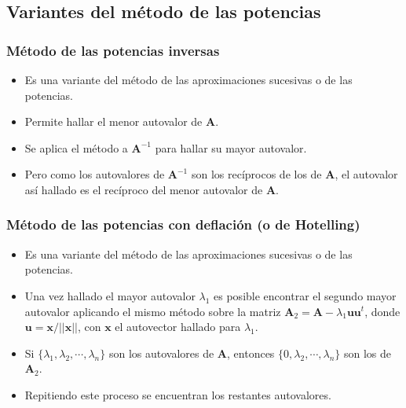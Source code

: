 \documentclass[openany]{book}
\providecommand{\tightlist}{%
  \setlength{\itemsep}{0pt}\setlength{\parskip}{0pt}}
\begin{document}
\hypertarget{variantes-del-muxe9todo-de-las-potencias}{%
\subsection{Variantes del método de las potencias}\label{variantes-del-muxe9todo-de-las-potencias}}

\hypertarget{muxe9todo-de-las-potencias-inversas}{%
\subsubsection*{Método de las potencias inversas}\label{muxe9todo-de-las-potencias-inversas}}

\begin{itemize}
\tightlist
\item
  Es una variante del método de las aproximaciones sucesivas o de las potencias.
\item
  Permite hallar el menor autovalor de \(\textbf{A}\).
\item
  Se aplica el método a \(\textbf{A}^{-1}\) para hallar su mayor autovalor.
\item
  Pero como los autovalores de \(\textbf{A}^{-1}\) son los recíprocos de los de \(\textbf{A}\), el autovalor así hallado es el recíproco del menor autovalor de \(\textbf{A}\).
\end{itemize}

\hypertarget{muxe9todo-de-las-potencias-con-deflaciuxf3n-o-de-hotelling}{%
\subsubsection*{Método de las potencias con deflación (o de Hotelling)}\label{muxe9todo-de-las-potencias-con-deflaciuxf3n-o-de-hotelling}}

\begin{itemize}
\item
  Es una variante del método de las aproximaciones sucesivas o de las potencias.
\item
  Una vez hallado el mayor autovalor \(\lambda_1\) es posible encontrar el segundo mayor autovalor aplicando el mismo método sobre la matriz \(\textbf{A}_2 = \textbf{A} - \lambda_1 \textbf{u} \textbf{u}^t\), donde \(\textbf{u} = \textbf{x} / ||\textbf{x}||\), con \(\textbf{x}\) el autovector hallado para \(\lambda_1\).
\item
  Si \(\{\lambda_1, \lambda_2, \cdots, \lambda_n\}\) son los autovalores de \(\textbf{A}\), entonces \(\{0, \lambda_2, \cdots, \lambda_n\}\) son los de \(\textbf{A}_2\).
\item
  Repitiendo este proceso se encuentran los restantes autovalores.
\end{itemize}
\end{document}

